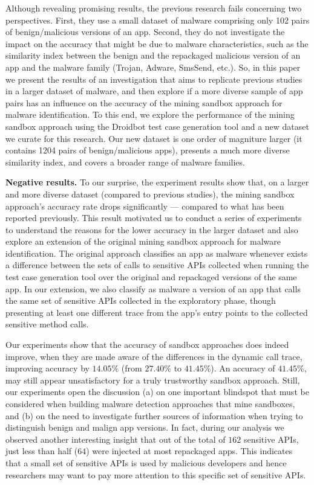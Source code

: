 Although revealing promising results, the previous research fails concerning two perspectives. First, they use a small dataset of malware comprising only 102 pairs of benign/malicious versions of an app. Second, they do not investigate the impact on the accuracy that might be due to malware characteristics, such as the similarity index between the benign and the repackaged malicious version of an app and the malware family (Trojan, Adware, SmsSend, etc.). So, in this paper we present the results of an investigation that aims to replicate previous studies~\cite{DBLP:conf/wcre/BaoLL18,DBLP:conf/scam/CostaMCMVBC20} in a larger dataset of malware, and then explore if a more diverse sample of app pairs has an influence on the accuracy of the mining sandbox approach for malware identification. To this end, we explore the performance of the mining sandbox approach using the Droidbot test case generation tool and a new dataset we curate for this research. Our new dataset is one order of magniture larger (it contains 1204 pairs of benign/malicious apps), presents a much more diverse similarity index, and covers a broader range of malware families. 



{\bf Negative results.} To our surprise, the experiment results show that, on a larger and more diverse dataset (compared to previous studies), the mining sandbox approach's accuracy rate drops significantly --- compared to what has been reported previously. This result motivated us to conduct a series of experiments to understand the reasons for the lower accuracy in the larger dataset and also explore an extension of the original mining sandbox approach for malware identification. The original approach classifies an app as malware whenever exists a difference between the sets of calls to sensitive APIs collected when running the test case generation tool over the original and repackaged versions of the same app. In our extension, we also classify as malware a version of an app that calls the same set of sensitive APIs collected in the exploratory phase, though presenting at least one different trace from the app's entry points to the collected sensitive method calls.


Our experiments show that the accuracy of sandbox approaches does indeed improve, when they are made aware of the differences in the dynamic call trace, improving accuracy by $14.05\%$ (from $27.40\%$ to $41.45\%$). 
An accuracy of $41.45\%$, may still appear unsatisfactory for a truly trustworthy sandbox approach. Still, 
our experiments open the discussion (a) on one important blindspot that must be considered when building 
malware detection approaches that mine sandboxes, and (b) on the need to investigate further sources of information when trying to distinguish benign and malign app versions. 
In fact, during our analysis we observed another interesting insight that out of the total of $162$ sensitive APIs, just less than half ($64$) were injected at most repackaged apps. 
This indicates that a small set of sensitive APIs is used by malicious developers and hence 
researchers may want to pay more attention to this specific set of sensitive APIs.\\

